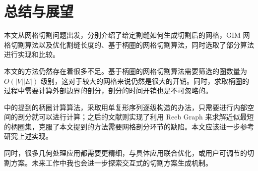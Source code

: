 
\chapter{总结与展望}

本文从网格切割问题出发，分别介绍了给定割缝如何生成切割后的网格，GIM 网格切割算法以及优化割缝长度的、基于柄圈的网格切割算法，同时选取了部分算法进行实现和比较。

本文的方法仍然存在着很多不足。基于柄圈的网格切割算法需要筛选的圈数量为 $ O(|V||E|) $ 级别，这对于较大的网格来说仍然是很大的开销。同时，求取柄圈的过程中需要计算外部边界的剖分，剖分的时间开销也是不可忽略的。

\citet{Dey2008} 中的提到的柄圈计算算法，采取用单复形序列逐级构造的办法，只需要进行内部空间的剖分就可以进行计算；之后的文献\cite{Dey2013}则实现了利用 Reeb Graph 来求解近似最短的柄圈集，克服了本文提到的方法需要网格剖分环节的缺陷。本文应该进一步参考研究上述实现。

同时，很多几何处理应用都需要更精细，与具体应用联合优化，或用户可调节的切割方案。未来工作中我也会进一步探索交互式的切割方案生成机制。